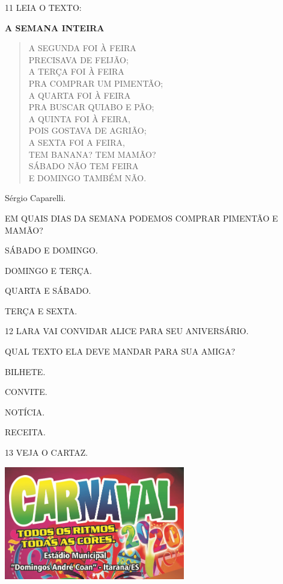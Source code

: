 \num{11} LEIA O TEXTO:

\textbf{A SEMANA INTEIRA}

\begin{verse}
A SEGUNDA FOI À FEIRA\\
PRECISAVA DE FEIJÃO;\\
A TERÇA FOI À FEIRA\\
PRA COMPRAR UM PIMENTÃO;\\
A QUARTA FOI À FEIRA\\
PRA BUSCAR QUIABO E PÃO;\\
A QUINTA FOI À FEIRA,\\
POIS GOSTAVA DE AGRIÃO;\\
A SEXTA FOI A FEIRA,\\
TEM BANANA? TEM MAMÃO?\\
SÁBADO NÃO TEM FEIRA\\
E DOMINGO TAMBÉM NÃO.
\end{verse}

Sérgio Caparelli.


EM QUAIS DIAS DA SEMANA PODEMOS COMPRAR PIMENTÃO E MAMÃO?

\begin{escolha}
\item SÁBADO E DOMINGO.

\item DOMINGO E TERÇA.

\item QUARTA E SÁBADO.

\item TERÇA E SEXTA.
\end{escolha}

\num{12} LARA VAI CONVIDAR ALICE PARA SEU ANIVERSÁRIO.

QUAL TEXTO ELA DEVE MANDAR PARA SUA AMIGA? 

\begin{escolha}
\item BILHETE.

\item CONVITE.

\item NOTÍCIA.

\item RECEITA.
\end{escolha}

\num{13} VEJA O CARTAZ.

\includegraphics[width=3.10650in,height=1.94326in]{media/image204.png}

